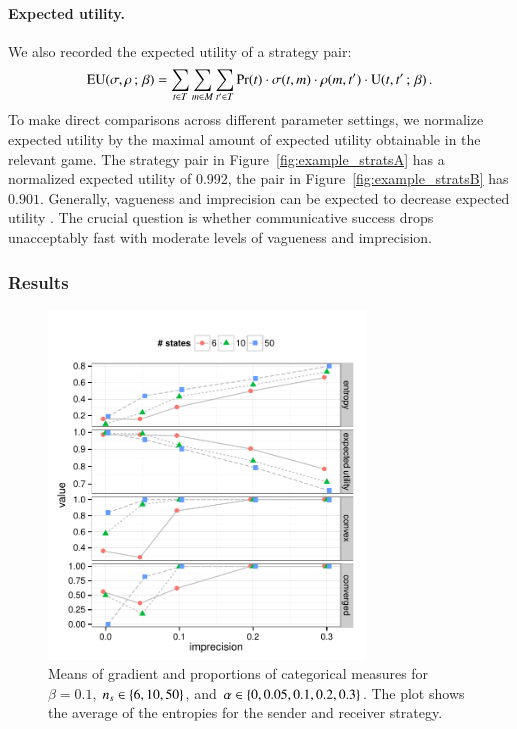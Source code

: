 \documentclass[fleqn,reqno,10pt]{article}
\newcommand{\imprecision}{\ensuremath{\alpha}} %
\newcommand{\toler}{\ensuremath{\beta}} %
\newcommand{\ns}{\ensuremath{n_s}} %
\begin{document}
\paragraph{Expected utility.} We also recorded the expected utility of
a strategy pair:
\begin{align*}
  \EU(\Sstrat,\Rstrat \myts ; \myts \toler) = \sum_{\state \in
    \States} \sum_{\messg \in \Messgs} \sum_{\state' \in \States}
  \Pr(\state) \cdot \Sstrat(\state, \messg) \cdot \Rstrat(\messg,
  \state') \cdot \Util(\state,\state' \myts ; \myts \toler)\,.
\end{align*}
To make direct comparisons across different parameter settings, we
normalize expected utility by the maximal amount of expected utility
obtainable in the relevant game. The strategy pair in
Figure~\ref{fig:example_stratsA} has a normalized expected utility of
$0.992$, the pair in Figure~\ref{fig:example_stratsB} has
$0.901$. Generally, vagueness and imprecision can be expected to
decrease expected utility
\citep[c.f.][]{Lipman2009:Why-is-Language}. The crucial question is
whether communicative success drops unacceptably fast with moderate
levels of vagueness and imprecision.

\subsubsection{Results}

\begin{figure}[t]
  \centering
  
  \includegraphics[width=0.75\textwidth]{plots/MeanMetrics3.pdf}

  \caption{Means of gradient and proportions of categorical measures
    for $\toler = 0.1$, $\ns \in \set{6, 10, 50}$, and $\imprecision
    \in \set{0, 0.05, 0.1, 0.2, 0.3}$. The plot shows the average of
    the entropies for the sender and receiver strategy.}
  \label{fig:MeanMetrics}
\end{figure}
\end{document}
